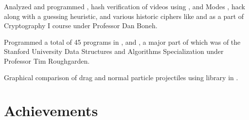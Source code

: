 \documentclass[]{deedy-resume-openfont}
\begin{document}
\vspace{\topsep} %
\begin{large}
\vbox{Analyzed and programmed , hash verification of videos using ,  and  Modes ,  hack along with a guessing heuristic, and various historic ciphers like  and  as a part of Cryptography I course under Professor Dan Boneh.}
\end{large}
\sectionsep

\vspace{\topsep} %
\begin{large}
\vbox{Programmed a total of 45 programs in ,  and , a major part of which was of the Stanford University Data Structures and Algorithms Specialization under Professor Tim Roughgarden.}
\end{large}
\sectionsep

\vspace{\topsep} %
\begin{large}
\vbox{Graphical comparison of drag and normal particle projectiles using  library in .}
\end{large}
\sectionsep

%
%

\section{Achievements}
\end{document}

